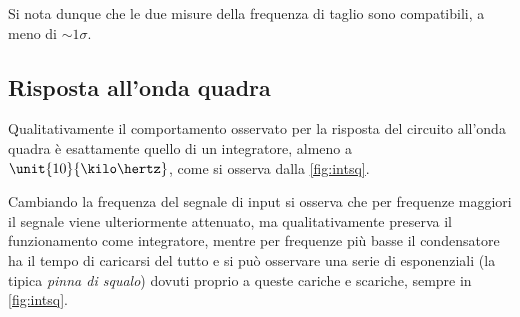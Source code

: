\documentclass[10pt,a4paper]{article}
\begin{document}
Si nota dunque che le due misure della frequenza di taglio sono compatibili, a meno di $\sim 1\sigma$.

\subsection{Risposta all'onda quadra}

Qualitativamente il comportamento osservato per la risposta del circuito all'onda quadra è esattamente quello di un integratore, almeno a $\unit{10}{\kilo\hertz}$, come si osserva dalla \figurename{\ref{fig:intsq}}.

Cambiando la frequenza del segnale di input si osserva che per frequenze maggiori il segnale viene ulteriormente attenuato, ma qualitativamente preserva il funzionamento come integratore, mentre per frequenze più basse il condensatore ha il tempo di caricarsi del tutto e si può osservare una serie di esponenziali (la tipica \emph{pinna di squalo}) dovuti proprio a queste cariche e scariche, sempre in \figurename{\ref{fig:intsq}}.
\end{document}
